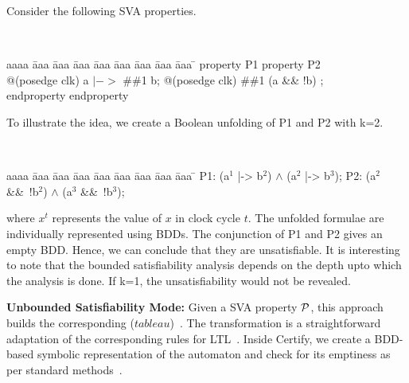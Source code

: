 \documentclass{svmult}
\begin{document}
\begin{example} \label{example3}
Consider the following SVA properties.
{\tt
\begin{tabbing}
aaaa \= aaa \= aaa \= aaa \= aaa \= aaa \= aaa \= aaa \= aaa \= \kill
\>property P1 \>\>\>\>\>\> \>\>property P2 \\
\>@(posedge clk) a $|->$ \#\#1 b; \>\>\>\>\>\>\>\> @(posedge clk) \#\#1 (a \&\& !b) ;\\
\>endproperty \>\>\>\>\>\>\>\>endproperty
\end{tabbing}
}

\noindent
To illustrate the idea, we create a Boolean unfolding of P1 and P2 with k=2.
{\tt
\begin{tabbing}
aaaa \= aaa \= aaa \= aaa \= aaa \= aaa \= aaa \= aaa \= aaa \= \kill
P1: (a$^1$ |-> b$^2$) $\land$ (a$^2$ |-> b$^3$);
\>\>\>\>\>\>\>P2: (a$^2$ \&\&\ !b$^2$) $\land$ (a$^3$ \&\&\ !b$^3$);
\end{tabbing}
}
\noindent
where $x^t$ represents the value of $x$ in clock cycle $t$. The 
unfolded formulae are individually represented using BDDs.
The conjunction of P1 and P2 gives an empty 
BDD. Hence, we can conclude that they are unsatisfiable. It is 
interesting to note that the bounded satisfiability analysis depends on 
the depth upto which the analysis is done. If k=1, the unsatisfiability 
would not be revealed. 
\end{example}

\noindent
{\bf Unbounded Satisfiability Mode:}
Given a SVA property ${\cal P}$, this approach builds the corresponding 
($tableau$)~\cite{roadmap}. The 
transformation is a straightforward adaptation of the corresponding rules 
for LTL~\cite{roadmap}. Inside Certify, we create a BDD-based 
symbolic representation of the automaton and check for its emptiness as 
per standard methods~\cite{roadmap}. \\
\end{document}
